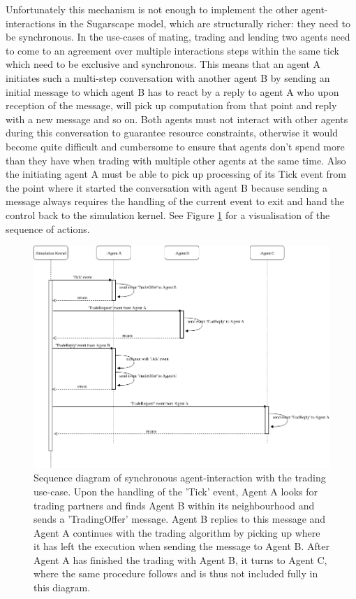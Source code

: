 Unfortunately this mechanism is not enough to implement the other agent-interactions in the Sugarscape model, which are structurally richer: they need to be synchronous. In the use-cases of mating, trading and lending two agents need to come to an agreement over multiple interactions steps within the same tick which need to be exclusive and synchronous.  This means that an agent A initiates such a multi-step conversation with another agent B by sending an initial message to which agent B has to react by a reply to agent A who upon reception of the message, will pick up computation from that point and reply with a new message and so on. Both agents must not interact with other agents during this conversation to guarantee resource constraints, otherwise it would become quite difficult and cumbersome to ensure that agents don't spend more than they have when trading with multiple other agents at the same time. Also the initiating agent A must be able to pick up processing of its Tick event from the point where it started the conversation with agent B because sending a message always requires the handling of the current event to exit and hand the control back to the simulation kernel. See Figure \ref{fig:syncagentinteractions} for a visualisation of the sequence of actions.

\begin{figure}
	\centering
	\includegraphics[width=1.0\textwidth, angle=0]{./fig/eventdriven/syncagentinteractions.png}
	\caption{Sequence diagram of synchronous agent-interaction with the trading use-case. Upon the handling of the 'Tick' event, Agent A looks for trading partners and finds Agent B within its neighbourhood and sends a 'TradingOffer' message. Agent B replies to this message and Agent A continues with the trading algorithm by picking up where it has left the execution when sending the message to Agent B. After Agent A has finished the trading with Agent B, it turns to Agent C, where the same procedure follows and is thus not included fully in this diagram.}
	\label{fig:syncagentinteractions}
\end{figure}


